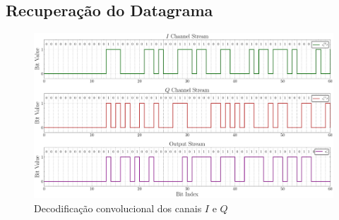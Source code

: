 \subsection{Recuperação do Datagrama}\label{sec:decodificacao_convolucional}

\begin{figure}[H]
	\centering
	\caption{Decodificação convolucional dos canais $I$ e $Q$}\label{fig:receiver_conv}
	\includegraphics[width=\linewidth]{assets/cap3/receiver_conv_time.pdf}
\end{figure}